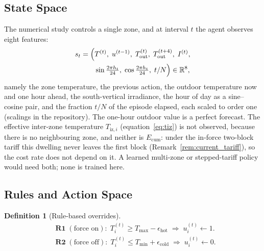 \documentclass[pdflatex,sn-mathphys-num,iicol]{sn-jnl}
\theoremstyle{thmstyleone}\newtheorem{proposition}{Proposition}\newtheorem{corollary}{Corollary}
\theoremstyle{thmstyletwo}\newtheorem{remark}{Remark}\newtheorem{observation}{Observation}
\theoremstyle{thmstylethree}\newtheorem{definition}{Definition}
\newcommand{\Rset}{\mathbb{R}}
\newcommand{\Tmin}{T_{\min}}
\newcommand{\Tmax}{T_{\max}}
\newcommand{\Tout}{T_{\mathrm{out}}}
\newcommand{\Tiz}[1]{T_{\mathrm{iz},#1}}
\begin{document}
\subsection{State Space}
\label{subsec:state}
 
The numerical study controls a single zone, and at interval $t$ the agent observes eight features:
\begin{equation}
\begin{split}
  s_t=\Bigl(&T^{(t)},\;u^{(t-1)},\;\Tout^{(t)},\;\Tout^{(t+4)},\;I^{(t)},\\
  &\sin\tfrac{2\pi h_t}{24},\;\cos\tfrac{2\pi h_t}{24},\;t/N\Bigr)\in\Rset^{8},
\end{split}
  \label{eq:state}
\end{equation}
namely the zone temperature, the previous action, the outdoor temperature now and one hour ahead, the south-vertical irradiance, the hour of day as a sine--cosine pair, and the fraction $t/N$ of the episode elapsed, each scaled to order one (scalings in the repository). The one-hour outdoor value is a perfect forecast. The effective inter-zone temperature $\Tiz{i}$ (equation~\eqref{eq:tiz}) is not observed, because there is no neighbouring zone, and neither is $E_{\mathrm{cum}}$: under the in-force two-block tariff this dwelling never leaves the first block (Remark~\ref{rem:current_tariff}), so the cost rate does not depend on it. A learned multi-zone or stepped-tariff policy would need both; none is trained here.

\subsection{Rules and Action Space}
\label{subsec:rules}
 
\begin{definition}[Rule-based overrides]
\label{def:rules}
\begin{align}
  &\textbf{R1}\;(\text{force on}):\;
    T_i^{(t)}\ge\Tmax-\epsilon_{\mathrm{hot}}
    \;\Rightarrow\;u_i^{(t)}\leftarrow1. \label{eq:R1}\\
  &\textbf{R2}\;(\text{force off}):\;
    T_i^{(t)}\le\Tmin+\epsilon_{\mathrm{cold}}
    \;\Rightarrow\;u_i^{(t)}\leftarrow0. \label{eq:R2}
\end{align}
\end{definition}
\end{document}
